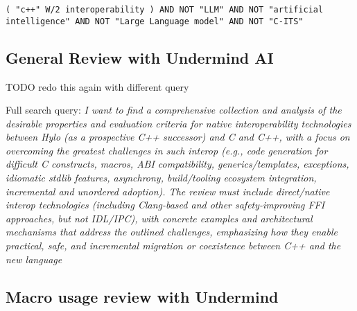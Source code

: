 \texttt{( "c++" W/2 interoperability ) AND NOT "LLM" AND NOT "artificial intelligence" AND NOT "Large Language model" AND NOT "C-ITS"
}

\subsection{General Review with Undermind AI}

TODO redo this again with different query

Full search query: \textit{I want to find a comprehensive collection and analysis of the desirable properties and evaluation criteria for native interoperability technologies between Hylo (as a prospective C++ successor) and C and C++, with a focus on overcoming the greatest challenges in such interop (e.g., code generation for difficult C constructs, macros, ABI compatibility, generics/templates, exceptions, idiomatic stdlib features, asynchrony, build/tooling ecosystem integration, incremental and unordered adoption). The review must include direct/native interop technologies (including Clang-based and other safety-improving FFI approaches, but not IDL/IPC), with concrete examples and architectural mechanisms that address the outlined challenges, emphasizing how they enable practical, safe, and incremental migration or coexistence between C++ and the new language}

\subsection{Macro usage review with Undermind}
